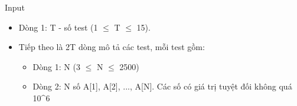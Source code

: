 Input
\begin{itemize}
	\item Dòng 1: T - số test (1  $\le$  T  $\le$  15).
	\item Tiếp theo là 2T dòng mô tả các test, mỗi test gồm:
\begin{itemize}
	\item Dòng 1: N (3  $\le$  N  $\le$  2500)
	\item Dòng 2: N số A[1], A[2], ..., A[N]. Các số có giá trị tuyệt đối không quá 10^6
\end{itemize}
\end{itemize}